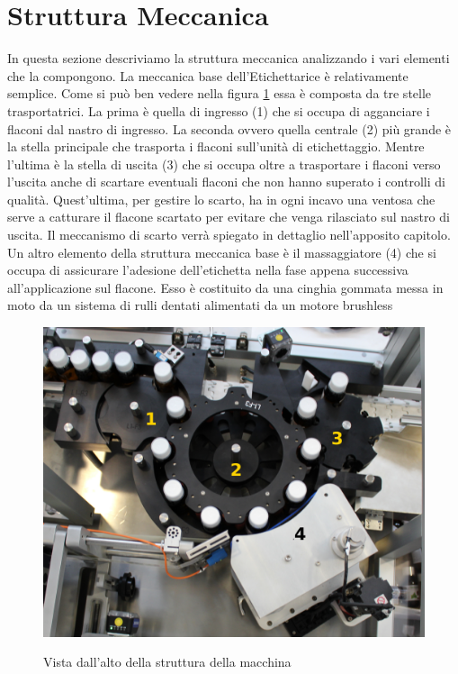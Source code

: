 \documentclass[12pt, a4paper, oneside]{book}
\begin{document}
\section{Struttura Meccanica}
In questa sezione descriviamo la struttura meccanica analizzando i vari elementi che la compongono.
La meccanica base dell'Etichettarice è relativamente semplice. Come si può ben vedere nella figura \ref{mec1} essa è composta da tre stelle trasportatrici. La prima è quella di ingresso (1) che si occupa di agganciare i flaconi dal nastro di ingresso. La seconda ovvero quella centrale (2) più grande è la stella principale che trasporta i flaconi sull'unità di etichettaggio. Mentre l'ultima è la stella di uscita (3) che si occupa oltre a trasportare i flaconi verso l'uscita anche di scartare eventuali flaconi che non hanno superato i controlli di qualità. Quest'ultima, per gestire lo scarto, ha in ogni incavo una ventosa che serve a catturare il flacone scartato per evitare che venga rilasciato sul nastro di uscita. Il meccanismo di scarto verrà spiegato in dettaglio nell'apposito capitolo.
Un altro elemento della struttura meccanica base è il massaggiatore (4) che si occupa di assicurare l'adesione dell'etichetta nella fase appena successiva all'applicazione sul flacone. Esso è costituito da una cinghia gommata messa in moto da un sistema di rulli dentati alimentati da un motore brushless



\begin{figure}[H]
	\centering
	\includegraphics[width=12cm]{Immagini/MEC1}
	\label{mec1}
	\caption{ Vista dall'alto della struttura della macchina}
\end{figure}
\end{document}
